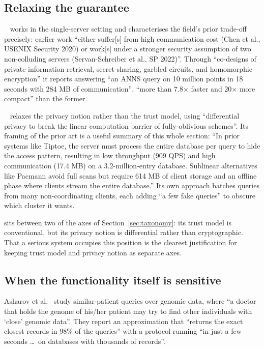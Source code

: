 \subsection{Relaxing the guarantee}
\label{sec:retrieval:relaxed}

\panther~\cite{panther2025} works in the single-server setting and characterises the field's prior
trade-off precisely: earlier work ``either suffer[s] from high communication cost (Chen et al.,
USENIX Security 2020) or work[s] under a stronger security assumption of two non-colluding servers
(Servan-Schreiber et al., SP 2022)''. Through ``co-designs of private information retrieval,
secret-sharing, garbled circuits, and homomorphic encryption'' it reports answering ``an ANNS
query on 10 million points in 18 seconds with 284 MB of communication'', ``more than 7.8$\times$
faster and 20$\times$ more compact'' than the former.

\wally~\cite{wally2024} relaxes the privacy notion rather than the trust model, using
``differential privacy to break the linear computation barrier of fully-oblivious schemes''. Its
framing of the prior art is a useful summary of this whole section: ``In prior systems like
Tiptoe, the server must process the entire database per query to hide the access pattern,
resulting in low throughput (909 QPS) and high communication (17.4 MB) on a 3.2-million-entry
database. Sublinear alternatives like Pacmann avoid full scans but require 614 MB of client
storage and an offline phase where clients stream the entire database.'' Its own approach batches
queries from many non-coordinating clients, each adding ``a few fake queries'' to obscure which
cluster it wants.

\wallyplain{} sits between two of the axes of Section~\ref{sec:taxonomy}: its trust model is
conventional, but its privacy notion is differential rather than cryptographic. That a serious
system occupies this position is the clearest justification for keeping trust model and privacy
notion as separate axes.

\subsection{When the functionality itself is sensitive}
\label{sec:retrieval:functionality}

Asharov et al.~\cite{asharov2018} study similar-patient queries over genomic data, where ``a doctor
that holds the genome of his/her patient may try to find other individuals with `close' genomic
data''. They report an approximation that ``returns the exact closest records in 98\% of the
queries'' with a protocol running ``in just a few seconds \dots\ on databases with thousands of
records''.

